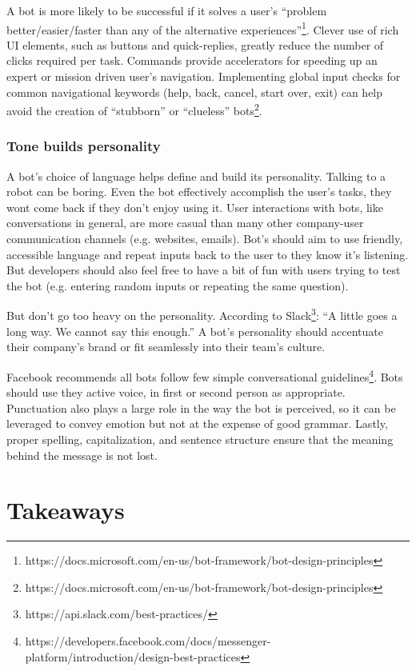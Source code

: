 \documentclass{sig-alternate}
\begin{document}
	A bot is more likely to be successful if it solves a user's ``problem better/easier/faster than any of the alternative experiences''\footnote{https://docs.microsoft.com/en-us/bot-framework/bot-design-principles}.  Clever use of rich UI elements, such as buttons and quick-replies, greatly reduce the number of clicks required per task.  Commands provide accelerators for speeding up an expert or mission driven user's navigation.
	Implementing global input checks for common navigational keywords (help, back, cancel, start over, exit) can help avoid the creation of ``stubborn'' or ``clueless'' bots\footnote{https://docs.microsoft.com/en-us/bot-framework/bot-design-principles}. 

	\subsubsection{Tone builds personality}

	A bot's choice of language helps define and build its personality.  Talking to a robot can be boring. Even the bot effectively accomplish the user's tasks, they wont come back if they don't enjoy using it. User interactions with bots, like conversations in general, are more casual than many other company-user communication channels (e.g. websites, emails).  Bot's should aim to use friendly, accessible language and repeat inputs back to the user to they know it's listening. But developers should also feel free to have a bit of fun with users trying to test the bot (e.g. entering random inputs or repeating the same question). 

	But don't go too heavy on the personality. According to Slack\footnote{https://api.slack.com/best-practices/}: ``A little goes a long way. We cannot say this enough.'' A bot's personality should accentuate their company's brand or fit seamlessly into their team's culture.  

	Facebook recommends all bots follow few simple conversational guidelines\footnote{https://developers.facebook.com/docs/messenger-platform/introduction/design-best-practices}. Bots should use they active voice, in first or second person as appropriate.  Punctuation also plays a large role in the way the bot is perceived, so it can be leveraged to convey emotion but not at the expense of good grammar.  Lastly, proper spelling, capitalization, and sentence structure ensure that the meaning behind the message is not lost.
 
\section{Takeaways}
\end{document}
